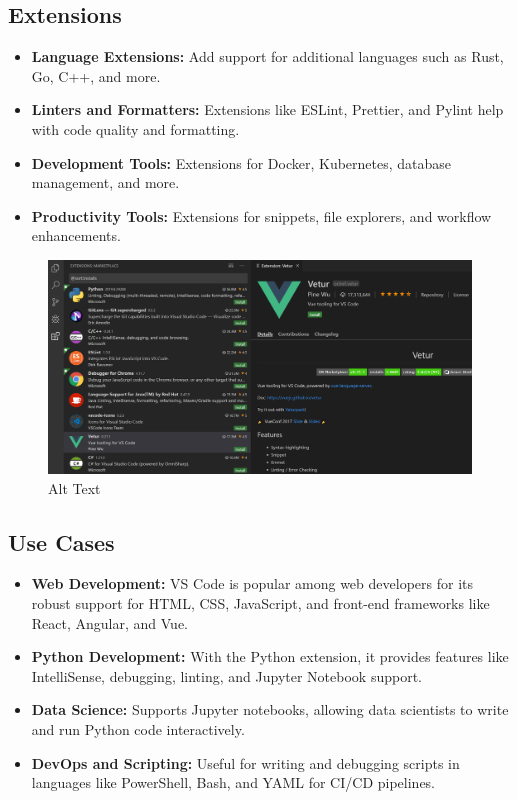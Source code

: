 \documentclass[
  letterpaper,
  DIV=11,
  numbers=noendperiod]{scrreprt}
\providecommand{\tightlist}{%
  \setlength{\itemsep}{0pt}\setlength{\parskip}{0pt}}\usepackage{longtable,booktabs,array}
\begin{document}
\hypertarget{extensions}{%
\subsection{Extensions}\label{extensions}}

\begin{itemize}
\tightlist
\item
  \textbf{Language Extensions:} Add support for additional languages
  such as Rust, Go, C++, and more.
\item
  \textbf{Linters and Formatters:} Extensions like ESLint, Prettier, and
  Pylint help with code quality and formatting.
\item
  \textbf{Development Tools:} Extensions for Docker, Kubernetes,
  database management, and more.
\item
  \textbf{Productivity Tools:} Extensions for snippets, file explorers,
  and workflow enhancements.
\end{itemize}

\begin{figure}

{\centering \includegraphics{images/extensions.png}

}

\caption{Alt Text}

\end{figure}

\hypertarget{use-cases}{%
\subsection{Use Cases}\label{use-cases}}

\begin{itemize}
\tightlist
\item
  \textbf{Web Development:} VS Code is popular among web developers for
  its robust support for HTML, CSS, JavaScript, and front-end frameworks
  like React, Angular, and Vue.
\item
  \textbf{Python Development:} With the Python extension, it provides
  features like IntelliSense, debugging, linting, and Jupyter Notebook
  support.
\item
  \textbf{Data Science:} Supports Jupyter notebooks, allowing data
  scientists to write and run Python code interactively.
\item
  \textbf{DevOps and Scripting:} Useful for writing and debugging
  scripts in languages like PowerShell, Bash, and YAML for CI/CD
  pipelines.
\end{itemize}
\end{document}
